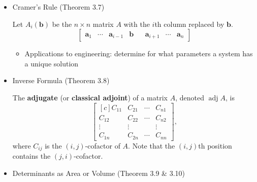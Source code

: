 \documentclass[10pt]{book}
\newenvironment{boxdef}{\begin{mdframed}[backgroundcolor=gray!30,linewidth=0pt,nobreak=true]}{\end{mdframed}}
\newcommand{\vect}[1]{\ensuremath{\boldsymbol{\mathbf{#1}}}}
\DeclareMathOperator{\adj}{adj}
\begin{document}
\begin{itemize}
	\item Cramer's Rule (Theorem 3.7)
		\begin{boxdef}
			Let $A_i(\vect{b})$ be the $n\times n$ matrix $A$ with the $i$th column replaced by $\vect{b}$.
			$$ \begin{bmatrix} \vect{a}_1 & \cdots & \vect{a}_{i-1} & \vect{b} & & \vect{a}_{i+1} & \cdots & \vect{a}_n \end{bmatrix} $$
		\end{boxdef}
	\begin{itemize}
		\item Applications to engineering: determine for what parameters a system has a unique solution
	\end{itemize}
	\item Inverse Formula (Theorem 3.8)
		\begin{boxdef}
			The \textbf{adjugate} (or \textbf{classical adjoint}) of a matrix $A$, denoted $\adj A$, is
			$$ \begin{bmatrix}[c]
			C_{11}&C_{21}&\cdots&C_{n1} \\
			C_{12}&C_{22}&\cdots&C_{n2} \\
			\vdots&\vdots&      &\vdots \\
			C_{1n}&C_{2n}&\cdots&C_{nn}
			\end{bmatrix},$$
			where $C_{ij}$ is the $(i,j)$-cofactor of $A$. Note that the $(i,j)$th position contains the $(j,i)$-cofactor.
		\end{boxdef}
	\item Determinants as Area or Volume (Theorem 3.9 \& 3.10)
\end{itemize}
\end{document}
